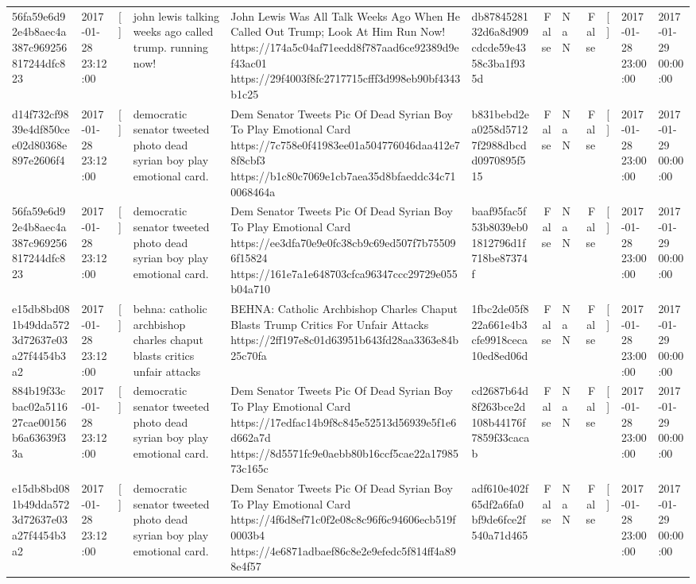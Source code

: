 \begin{tabular}{llllllrlrlll}
56fa59e6d92e4b8aec4a387c969256817244dfc823 & 2017-01-28 23:12:00 & [] & john lewis talking weeks ago called trump. running now! & John Lewis Was All Talk Weeks Ago When He Called Out Trump; Look At Him Run Now! https://174a5c04af71eedd8f787aad6ce92389d9ef43ac01 https://29f4003f8fc2717715cfff3d998eb90bf4343b1c25 & db8784528132d6a8d909cdcde59e4358c3ba1f935d & False & NaN & False & [] & 2017-01-28 23:00:00 & 2017-01-29 00:00:00 \\
d14f732cf9839e4df850cee02d80368e897e2606f4 & 2017-01-28 23:12:00 & [] & democratic senator tweeted photo dead syrian boy play emotional card. & Dem Senator Tweets Pic Of Dead Syrian Boy To Play Emotional Card https://7c758e0f41983ee01a504776046daa412e78f8cbf3 https://b1c80c7069e1cb7aea35d8bfaeddc34c710068464a & b831bebd2ea0258d57127f2988dbcdd0970895f515 & False & NaN & False & [] & 2017-01-28 23:00:00 & 2017-01-29 00:00:00 \\
56fa59e6d92e4b8aec4a387c969256817244dfc823 & 2017-01-28 23:12:00 & [] & democratic senator tweeted photo dead syrian boy play emotional card. & Dem Senator Tweets Pic Of Dead Syrian Boy To Play Emotional Card https://ee3dfa70e9e0fc38cb9c69ed507f7b755096f15824 https://161e7a1e648703cfca96347ccc29729e055b04a710 & baaf95fac5f53b8039eb01812796d1f718be87374f & False & NaN & False & [] & 2017-01-28 23:00:00 & 2017-01-29 00:00:00 \\
e15db8bd081b49dda5723d72637e03a27f4454b3a2 & 2017-01-28 23:12:00 & [] & behna: catholic archbishop charles chaput blasts critics unfair attacks & BEHNA: Catholic Archbishop Charles Chaput Blasts Trump Critics For Unfair Attacks https://2ff197e8c01d63951b643fd28aa3363e84b25c70fa & 1fbc2de05f822a661e4b3cfe9918ceca10ed8ed06d & False & NaN & False & [] & 2017-01-28 23:00:00 & 2017-01-29 00:00:00 \\
884b19f33cbac02a511627cae00156b6a63639f33a & 2017-01-28 23:12:00 & [] & democratic senator tweeted photo dead syrian boy play emotional card. & Dem Senator Tweets Pic Of Dead Syrian Boy To Play Emotional Card https://17edfac14b9f8c845e52513d56939e5f1e6d662a7d https://8d5571fc9e0aebb80b16ccf5cae22a1798573c165c & cd2687b64d8f263bce2d108b44176f7859f33cacab & False & NaN & False & [] & 2017-01-28 23:00:00 & 2017-01-29 00:00:00 \\
e15db8bd081b49dda5723d72637e03a27f4454b3a2 & 2017-01-28 23:12:00 & [] & democratic senator tweeted photo dead syrian boy play emotional card. & Dem Senator Tweets Pic Of Dead Syrian Boy To Play Emotional Card https://4f6d8ef71c0f2e08c8c96f6c94606ecb519f0003b4 https://4e6871adbaef86c8e2e9efedc5f814ff4a898e4f57 & adf610e402f65df2a6fa0bf9de6fce2f540a71d465 & False & NaN & False & [] & 2017-01-28 23:00:00 & 2017-01-29 00:00:00 \\

\end{tabular}
